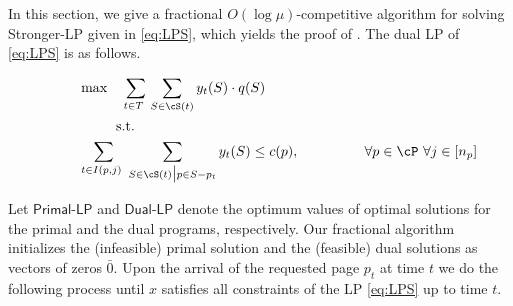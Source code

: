 In this section, we give a fractional $O\left(\log \mu\right)$-competitive algorithm for solving \textsf{Stronger-LP} given in \eqref{eq:LPS}, which yields the proof of . The dual LP of \eqref{eq:LPS} is as follows. 

\begin{equation}
	\label{eq:dualS}
	\begin{aligned}
		~~~~~~~~	& \max~~~ \sum_{t \in T~} \sum_{S  \in \cS(t)} y_t(S) \cdot q(S)\\
		& ~~~~~~~~\text{s.t. }\\
		& \sum_{t \in I(p,j)~} \sum_{S \in \cS(t)\big|p \in S-p_t} y_t(S) \leq c(p), 	~~~~~~~~~~~~~~\forall p \in \cP~\forall j \in [n_p]\\ 
	\end{aligned}
\end{equation} 


Let $\textsf{Primal-LP}$ and $\textsf{Dual-LP}$  denote the optimum values of optimal solutions for the primal and the dual programs, respectively.  %
Our fractional algorithm initializes the (infeasible) primal solution and the (feasible) dual solutions as vectors of zeros $\bar{0}$. Upon the arrival of the requested page $p_t$ at time $t$ we do the following process until $x$ satisfies all constraints of the LP \eqref{eq:LPS} up to time $t$. 


